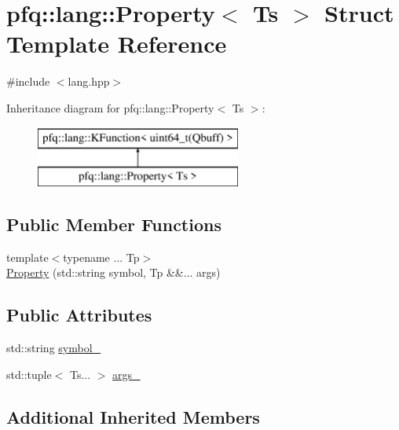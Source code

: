 \hypertarget{structpfq_1_1lang_1_1Property}{}\section{pfq\+:\+:lang\+:\+:Property$<$ Ts $>$ Struct Template Reference}
\label{structpfq_1_1lang_1_1Property}


{\ttfamily \#include $<$lang.\+hpp$>$}

Inheritance diagram for pfq\+:\+:lang\+:\+:Property$<$ Ts $>$\+:\begin{figure}[H]
\begin{center}
\leavevmode
\includegraphics[height=2.000000cm]{structpfq_1_1lang_1_1Property}
\end{center}
\end{figure}
\subsection*{Public Member Functions}
\begin{DoxyCompactItemize}
\item 
{\footnotesize template$<$typename ... Tp$>$ }\\\hyperlink{structpfq_1_1lang_1_1Property_a9adc3ecb01a6789d3fe1bee6f75dabc3}{Property} (std\+::string symbol, Tp \&\&... args)
\end{DoxyCompactItemize}
\subsection*{Public Attributes}
\begin{DoxyCompactItemize}
\item 
std\+::string \hyperlink{structpfq_1_1lang_1_1Property_a27cdbc97fd6ffc8b92ff75599c7dce72}{symbol\+\_\+}
\item 
std\+::tuple$<$ Ts... $>$ \hyperlink{structpfq_1_1lang_1_1Property_a01e0bf793226860cbafe4bea5075d507}{args\+\_\+}
\end{DoxyCompactItemize}
\subsection*{Additional Inherited Members}


